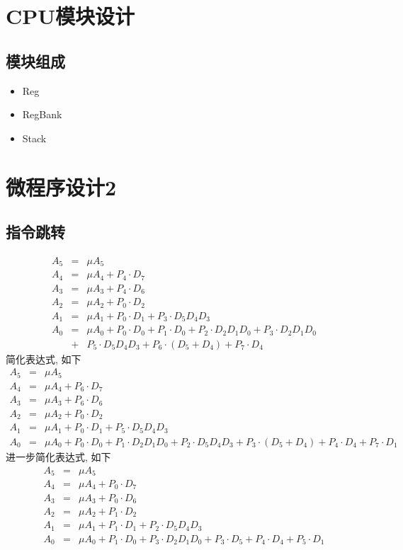 \documentclass[10pt]{book}
\begin{document}
\chapter{CPU模块设计}
\section{模块组成}
\begin{itemize}
  \item Reg
  \item RegBank
  \item Stack
\end{itemize}


\chapter{微程序设计2}
\section{指令跳转}
\begin{eqnarray}
A_5 &=& \mu A_5 \\
A_4 &=& \mu A_4+P_4\cdot D_7 \\
A_3 &=& \mu A_3+P_4\cdot D_6 \\
A_2 &=& \mu A_2+P_0\cdot D_2 \\
A_1 &=& \mu A_1+P_0\cdot D_1+P_3\cdot D_5D_4D_3 \\
A_0 &=& \mu A_0+P_0\cdot D_0+P_1\cdot D_0+P_2\cdot D_2D_1D_0+P_3\cdot D_2D_1D_0 \\
    &+& P_5\cdot D_5D_4D_3+P_6\cdot (D_5+D_4)+P_7\cdot D_4
\end{eqnarray}
简化表达式, 如下
\begin{eqnarray}
A_5 &=& \mu A_5 \\
A_4 &=& \mu A_4+P_6\cdot D_7 \\
A_3 &=& \mu A_3+P_6\cdot D_6 \\
A_2 &=& \mu A_2+P_0\cdot D_2 \\
A_1 &=& \mu A_1+P_0\cdot D_1+P_5\cdot D_5D_4D_3 \\
A_0 &=& \mu A_0+P_0\cdot D_0+P_1\cdot D_2D_1D_0+P_2\cdot D_5D_4D_3+P_3\cdot (D_5+D_4)+P_4\cdot D_4+P_7\cdot D_1
\end{eqnarray}
进一步简化表达式, 如下
\begin{eqnarray}
A_5 &=& \mu A_5 \\
A_4 &=& \mu A_4+P_0\cdot D_7 \\
A_3 &=& \mu A_3+P_0\cdot D_6 \\
A_2 &=& \mu A_2+P_1\cdot D_2 \\
A_1 &=& \mu A_1+P_1\cdot D_1+P_2\cdot D_5D_4D_3 \\
A_0 &=& \mu A_0+P_1\cdot D_0+P_3\cdot D_2D_1D_0+P_3\cdot D_5+P_4\cdot D_4+P_5\cdot D_1
\end{eqnarray}
\end{document}
